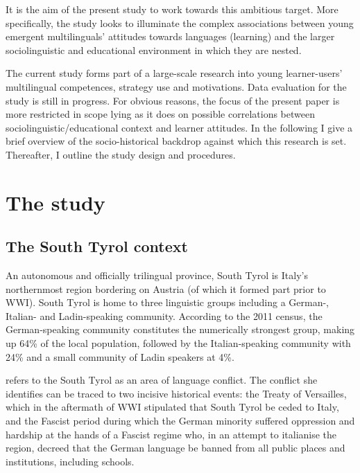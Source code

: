 \documentclass[output=paper]{../langscibook}
\begin{document}
It is the aim of the present study to work towards this ambitious target. More specifically, the study looks to illuminate the complex associations between young emergent multilinguals’ attitudes towards languages (learning) and the larger sociolinguistic and educational environment in which they are nested. 

The current study forms part of a large-scale research into young learner-users’ multilingual competences, strategy use and motivations. Data evaluation for the study is still in progress. For obvious reasons, the focus of the present paper is more restricted in scope lying as it does on possible correlations between sociolinguistic/educational context and learner attitudes. In the following I give a brief overview of the socio-historical backdrop against which this research is set. Thereafter, I outline the study design and procedures.

 \section{ The study}

 \subsection{The South Tyrol context}


An autonomous and officially trilingual province, South Tyrol is Italy’s northernmost region bordering on Austria (of which it formed part prior to WWI). South Tyrol is home to three linguistic groups including a German-, Italian- and Ladin-speaking community. According to the 2011 census, the German-speaking community constitutes the numerically strongest group, making up 64\% of the local population, followed by the Italian-speaking community with 24\% and a small community of Ladin speakers at 4\%. 

\citet{DeAngelis2012} refers to the South Tyrol as an area of language conflict. The conflict she identifies can be traced to two incisive historical events: the Treaty of Versailles, which in the aftermath of WWI stipulated that South Tyrol be ceded to Italy, and the Fascist period during which the German minority suffered oppression and hardship at the hands of a Fascist regime who, in an attempt to italianise the region, decreed that the German language be banned from all public places and institutions, including schools. 
\end{document}
